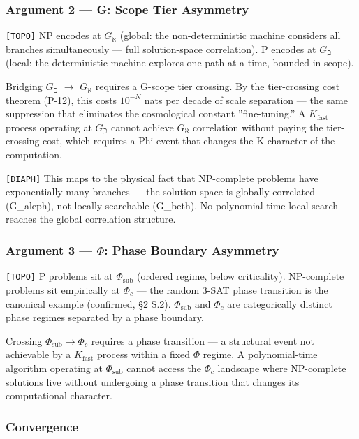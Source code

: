 \documentclass[12pt,a4paper]{article}
\newcommand{\pilcrow}{\S}
\begin{document}
\subsubsection{Argument 2 --- G: Scope Tier Asymmetry}

\texttt{{[}TOPO{]}} NP encodes at $G_{\aleph}$ (global: the non-deterministic machine considers all branches simultaneously --- full solution-space correlation). P encodes at $G_{\beth}$ (local: the deterministic machine explores one path at a time, bounded in scope).

Bridging $G_{\beth}$ $\to$ $G_{\aleph}$ requires a G-scope tier crossing. By the tier-crossing cost theorem (P-12), this costs $10^{-N}$ nats per decade of scale separation --- the same suppression that eliminates the cosmological constant ''fine-tuning.'' A $K_{\text{fast}}$ process operating at $G_{\beth}$ cannot achieve $G_{\aleph}$ correlation without paying the tier-crossing cost, which requires a Phi event that changes the K character of the computation.

\texttt{{[}DIAPH{]}} This maps to the physical fact that NP-complete problems have exponentially many branches --- the solution space is globally correlated (G\_aleph), not locally searchable (G\_beth). No polynomial-time local search reaches the global correlation structure.

\subsubsection{Argument 3 --- $\Phi$: Phase Boundary Asymmetry}

\texttt{{[}TOPO{]}} P problems sit at $\Phi_{\text{sub}}$ (ordered regime, below criticality). NP-complete problems sit empirically at $\Phi_c$ --- the random 3-SAT phase transition is the canonical example (confirmed, \pilcrow{}2 S.2). $\Phi_{\text{sub}}$ and $\Phi_c$ are categorically distinct phase regimes separated by a phase boundary.

Crossing $\Phi_{\text{sub}} \to \Phi_c$ requires a phase transition --- a structural event not achievable by a $K_{\text{fast}}$ process within a fixed $\Phi$ regime. A polynomial-time algorithm operating at $\Phi_{\text{sub}}$ cannot access the $\Phi_c$ landscape where NP-complete solutions live without undergoing a phase transition that changes its computational character.

\subsubsection{Convergence}
\end{document}
